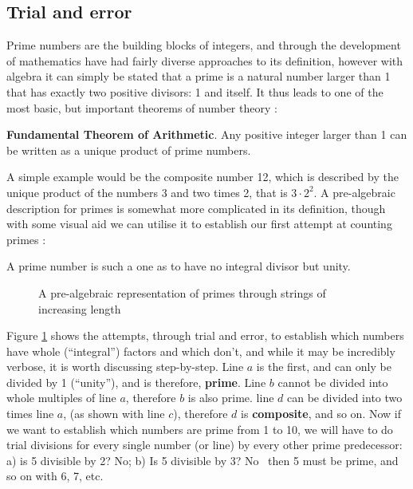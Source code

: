 \subsection{Trial and error} \label{Trial And Error}
Prime numbers are the building blocks of integers, and through the development of mathematics have had fairly diverse approaches to its definition, however with algebra it can simply be stated that a prime is a natural number larger than 1 that has exactly two positive divisors: 1 and itself. It thus leads to one of the most basic, but important theorems of number theory \citep[Book IX, Proposition 14]{EuclidElements}:
\begin{Thm} \label{thm:FTA}
	\textbf{Fundamental Theorem of Arithmetic}. Any positive integer larger than 1 can be written as a unique product of prime numbers.
\end{Thm}
A simple example would be the composite number 12, which is described by the unique product of the numbers 3 and two times 2, that is $3\cdot2^2$. A pre-algebraic description for primes is somewhat more complicated in its definition, though with some visual aid we can utilise it to establish our first attempt at counting primes \citep[p.327]{Horsley1772Sieve}:
\begin{Def}
	A prime number is such a one as to have no integral divisor but unity\footnotemark. 
\end{Def}
\begin{figure}[h]
\caption{A pre-algebraic representation of primes through strings of increasing length}
\label{gr:WhatArePrimes}
\end{figure}

Figure \ref{gr:WhatArePrimes} shows the attempts, through trial and error, to establish which numbers have whole (``integral'') factors and which don't, and while it may be incredibly verbose, it is worth discussing step-by-step. Line $a$ is the first, and can only be divided by 1 (``unity''), and is therefore, \textbf{prime}. Line $b$ cannot be divided into whole multiples of line $a$, therefore $b$ is also prime. line $d$ can be divided into two times line $a$, (as shown with line $c$), therefore $d$ is \textbf{composite}, and so on. Now if we want to establish which numbers are prime from 1 to 10, we will have to do trial divisions for every single number (or line) by every other prime predecessor: a) is 5 divisible by 2? No; b) Is 5 divisible by 3? No \textendash\ then 5 must be prime, and so on with 6, 7, etc.


